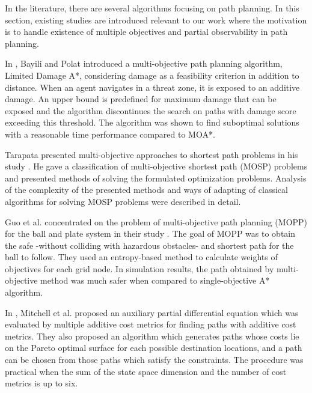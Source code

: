 \documentclass[10pt,journal]{IEEEtran}
\begin{document}
In the literature, there are several algorithms focusing on path planning. In this section, existing studies are introduced relevant to our work where the motivation is to handle existence of multiple objectives and partial observability in path planning.

In  \cite{LDAStarBayili:2008}, Bayili and Polat introduced a multi-objective path planning algorithm, Limited Damage A*,  considering damage as a feasibility criterion in addition to distance. When an agent navigates in a threat zone, it is exposed to an additive damage. An upper bound is predefined for maximum damage that can be exposed and the algorithm discontinues the search on paths with damage score exceeding this threshold. The algorithm was shown to find suboptimal solutions with a reasonable time performance compared to MOA*.

Tarapata presented multi-objective approaches to shortest path problems in his study \cite{Tarapata:2007}. He gave a classification of multi-objective shortest path (MOSP) problems and presented methods of solving the formulated optimization problems. Analysis of the complexity of the presented methods and ways of adapting of classical algorithms for solving MOSP problems were described in detail.

Guo et al. concentrated on the problem of multi-objective path planning (MOPP) for the ball and plate system in their study \cite{Guo:2009}. The goal of MOPP was to obtain the safe -without colliding with hazardous obstacles- and shortest path for the ball to follow. They used an entropy-based method to calculate weights of objectives for each grid node. In simulation results, the path obtained by multi-objective method was much safer when compared to single-objective A* algorithm.

In \cite{Mitchell:2009}, Mitchell et al. 
proposed an auxiliary partial differential equation which was evaluated by multiple additive cost metrics for finding paths with additive cost metrics. 
They also proposed an algorithm which generates paths whose costs lie on the Pareto optimal surface for each possible destination locations, and a path can be chosen from those paths which satisfy the constraints. The procedure was practical when the sum of the state space dimension and the number of cost metrics is up to six.
\end{document}
